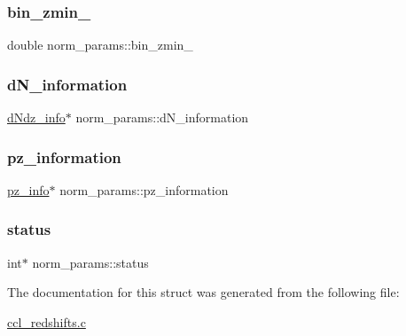 \subsubsection{\texorpdfstring{bin\+\_\+zmin\+\_\+}{bin\_zmin\_}}
{\footnotesize\ttfamily double norm\+\_\+params\+::bin\+\_\+zmin\+\_\+}

\mbox{\label{structnorm__params_ae0fd83adc177602d32bd25a2bf800f42}} 
\subsubsection{\texorpdfstring{d\+N\+\_\+information}{dN\_information}}
{\footnotesize\ttfamily \mbox{\hyperlink{structd_ndz__info}{d\+Ndz\+\_\+info}}$\ast$ norm\+\_\+params\+::d\+N\+\_\+information}

\mbox{\label{structnorm__params_a8a5df03d132c8f5ccbbe582a38a91e52}} 
\subsubsection{\texorpdfstring{pz\+\_\+information}{pz\_information}}
{\footnotesize\ttfamily \mbox{\hyperlink{structpz__info}{pz\+\_\+info}}$\ast$ norm\+\_\+params\+::pz\+\_\+information}

\mbox{\label{structnorm__params_af115f32a22df005a5723e2d7c905de51}} 
\subsubsection{\texorpdfstring{status}{status}}
{\footnotesize\ttfamily int$\ast$ norm\+\_\+params\+::status}



The documentation for this struct was generated from the following file\+:\begin{DoxyCompactItemize}
\item 
\mbox{\hyperlink{ccl__redshifts_8c}{ccl\+\_\+redshifts.\+c}}\end{DoxyCompactItemize}
